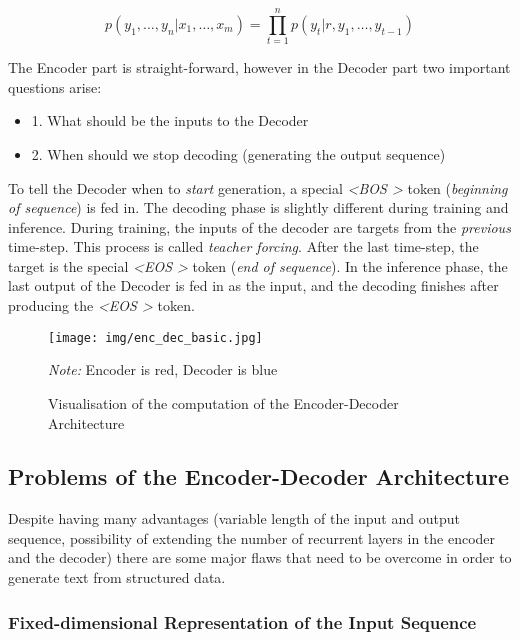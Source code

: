 \begin{equation} \label{enc_dec_base}
p(y_1,\dots,y_n | x_1,\dots,x_m) = \prod_{t=1}^{n}{p(y_t | r, y_1,\dots,y_{t-1})}
\end{equation}

The Encoder part is straight-forward, however in the Decoder part two important questions arise:
\begin{itemize}
    \item 1. What should be the inputs to the Decoder
    \item 2. When should we stop decoding (generating the output sequence)
\end{itemize}

To tell the Decoder when to \emph{start} generation, a special \emph{\textless BOS \textgreater} token (\emph{beginning of sequence}) is fed in. The decoding phase is slightly different during training and inference. During training, the inputs of the decoder are targets from the \emph{previous} time-step. This process is called \emph{teacher forcing}. After the last time-step, the target is the special \emph{\textless EOS \textgreater} token (\emph{end of sequence}). In the inference phase, the last output of the Decoder is fed in as the input, and the decoding finishes after producing the \emph{\textless EOS \textgreater} token.

\begin{figure}[!h]
    \centering
    \texttt{[image: img/enc\_dec\_basic.jpg]}

    \footnotesize{\textit{Note:} Encoder is red, Decoder is blue}
    \caption{Visualisation of the computation of the Encoder-Decoder Architecture} \label{enc_dec_visualisation}
\end{figure}

\subsection{Problems of the Encoder-Decoder Architecture}

Despite having many advantages (variable length of the input and output sequence, possibility of extending the number of recurrent layers in the encoder and the decoder) there are some major flaws that need to be overcome in order to generate text from structured data.

\subsubsection{Fixed-dimensional Representation of the Input Sequence} \label{fixed_repre_problem}

